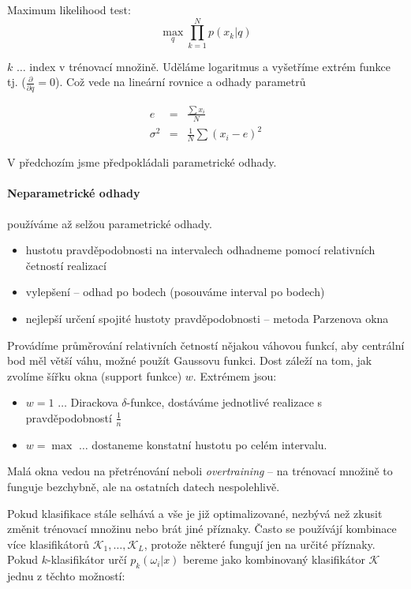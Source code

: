 Maximum likelihood test:
\begin{equation}
\max\limits_q\prod\limits_{k=1}^N p(x_k|q)
\end{equation}

$k$ $\dots$ index v trénovací množině. Uděláme logaritmus a vyšetříme extrém funkce tj. ($\frac{\partial}{\partial q}=0$).
Což vede na lineární rovnice a odhady parametrů

\begin{eqnarray}
e&=&\frac{\sum x_i}{N}\\
\sigma^2&=&\frac{1}{N}\sum(x_i-e)^2
\end{eqnarray}

V předchozím jsme předpokládali parametrické odhady.

\paragraph{Neparametrické odhady} používáme až selžou parametrické odhady.

\begin{itemize}
\item hustotu pravděpodobnosti  na intervalech odhadneme pomocí relativních četností realizací
\item vylepšení -- odhad po bodech (posouváme interval po bodech)
\item nejlepší určení spojité hustoty pravděpodobnosti -- metoda Parzenova okna
\end{itemize}

Provádíme průměrování relativních četností nějakou váhovou funkcí, aby centrální bod měl větší váhu, 
možné použít Gaussovu funkci. Dost záleží na tom, jak zvolíme šířku okna (support funkce)  $w$. Extrémem 
jsou:
\begin{itemize}
\item $w=1$ $\dots$ Dirackova $\delta$-funkce, dostáváme jednotlivé realizace s pravděpodobností $\frac{1}{n}$
\item $w=\max$ $\dots$ dostaneme konstatní hustotu po celém intervalu. 
\end{itemize}

Malá okna vedou na přetrénování neboli {\em overtraining} -- na trénovací množině to funguje bezchybně, ale na ostatních
datech nespolehlivě.


Pokud klasifikace stále selhává a vše je již optimalizované, nezbývá než zkusit změnit trénovací množinu nebo
brát jiné příznaky. Často se používájí kombinace více klasifikátorů $\mathcal{K}_1,\dots,\mathcal{K}_L$, protože 
některé fungují jen na určité příznaky. Pokud $k$-klasifikátor určí $p_k(\omega_i|x)$ bereme jako kombinovaný
klasifikátor $\mathcal{K}$ jednu z těchto možností:

